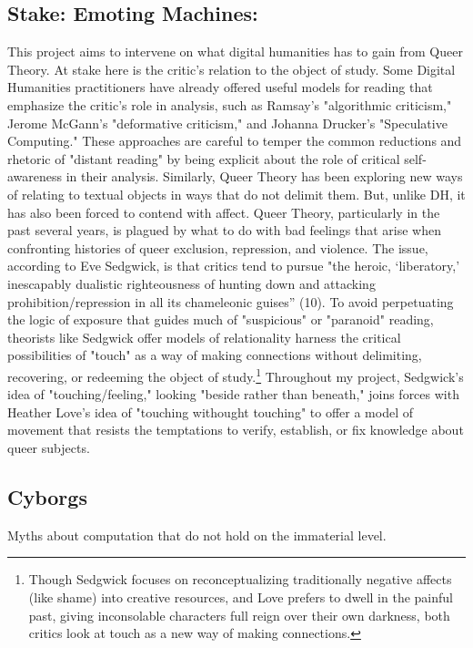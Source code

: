 \documentclass[11pt]{article}
\begin{document}
\subsection{Stake: Emoting Machines:}
\label{sec:org2191072}
This project aims to intervene on what digital humanities has to gain
from Queer Theory. At stake here is the critic's relation to the
object of study. Some Digital Humanities practitioners have already
offered useful models for reading that emphasize the critic's role in
analysis, such as Ramsay's "algorithmic criticism," Jerome McGann's
"deformative criticism," and Johanna Drucker's "Speculative
Computing." These approaches are careful to temper the common
reductions and rhetoric of "distant reading" by being explicit about
the role of critical self-awareness in their analysis. Similarly,
Queer Theory has been exploring new ways of relating to textual
objects in ways that do not delimit them. But, unlike DH, it has also
been forced to contend with affect. Queer Theory, particularly in the
past several years, is plagued by what to do with bad feelings that
arise when confronting histories of queer exclusion, repression, and
violence. The issue, according to Eve Sedgwick, is that critics tend
to pursue "the heroic, ‘liberatory,’ inescapably dualistic
righteousness of hunting down and attacking prohibition/repression in
all its chameleonic guises” (10). To avoid perpetuating the logic of
exposure that guides much of "suspicious" or "paranoid" reading,
theorists like Sedgwick offer models of relationality harness the
critical possibilities of "touch" as a way of making connections
without delimiting, recovering, or redeeming the object of
study.\footnote{Though Sedgwick focuses on reconceptualizing
traditionally negative affects (like shame) into creative resources,
and Love prefers to dwell in the painful past, giving inconsolable
characters full reign over their own darkness, both critics look at
touch as a new way of making connections.} Throughout my project, Sedgwick's idea of
"touching/feeling," looking "beside rather than beneath," joins forces
with Heather Love's idea of "touching withought touching" to offer a
model of movement that resists the temptations to verify, establish,
or fix knowledge about queer subjects.

\subsection{Cyborgs}
\label{sec:org84d68ec}

Myths about computation that do not hold on the immaterial level. 
\end{document}
